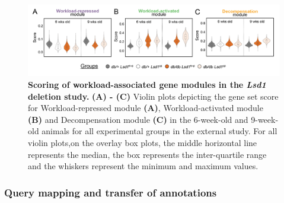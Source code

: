 \begin{figure}[H]
    \centering
    \includegraphics[width=\linewidth]{Chapter5/Fig/F3-17-01.png}
    \caption[Scoring of workload-associated gene modules in the \textit{Lsd1} deletion study]{\textbf{Scoring of workload-associated gene modules in the \textit{Lsd1} deletion study.} \textbf{(A) - (C)} Violin plots depicting the gene set score for Workload-repressed module \textbf{(A)}, Workload-activated module \textbf{(B)} and Decompensation module \textbf{(C)} in the 6-week-old and 9-week-old animals for all experimental groups in the external study. For all violin plots,on the overlay box plots, the middle horizontal line represents the median, the box represents the inter-quartile range and the whiskers represent the minimum and maximum values.}
    \label{fig:chp3_valid_study_genescores}
\end{figure}


\subsubsection{\large Query mapping and transfer of annotations}

